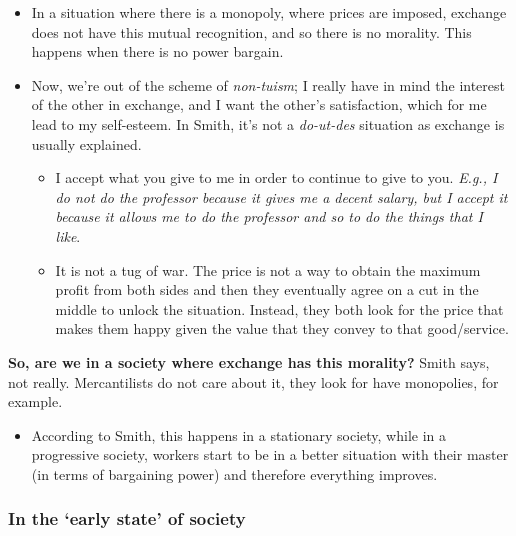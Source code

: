     \begin{remark}
        \begin{itemize}
            \item In a situation where there is a monopoly, where prices are imposed, exchange does not have this mutual recognition, and so there is no morality. This happens when there is no power bargain.
            \item Now, we’re out of the scheme of \textit{non-tuism}; I really have in mind the interest of the other in exchange, and I want the other’s satisfaction, which for me lead to my self-esteem. In Smith, it’s not a \textit{do-ut-des} situation as exchange is usually explained.
                \begin{itemize}
                    \item I accept what you give to me in order to continue to give to you. \textit{E.g., I do not do the professor because it gives me a decent salary, but I accept it because it allows me to do the professor and so to do the things that I like}.
                    \item It is not a tug of war. The price is not a way to obtain the maximum profit from both sides and then they eventually agree on a cut in the middle to unlock the situation. Instead, they both look for the price that makes them happy given the value that they convey to that good/service. 
                \end{itemize}
        \end{itemize}
    \end{remark}

    \begin{remark}
        \textbf{So, are we in a society where exchange has this morality?} Smith says, not really. Mercantilists do not care about it, they look for have monopolies, for example.
            \begin{itemize}
                \item According to Smith, this happens in a stationary society, while in a progressive society, workers start to be in a better situation with their master (in terms of bargaining power) and therefore everything improves.
            \end{itemize}
    \end{remark}

        \subsubsection{In the ‘early state’ of society}

